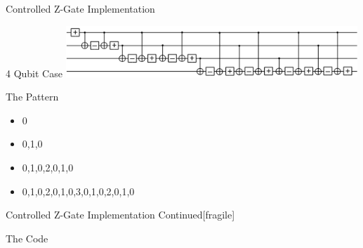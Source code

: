 \documentclass{beamer}
\begin{document}
\begin{frame}{Controlled Z-Gate Implementation}

\begin{block}{4 Qubit Case}
\includegraphics[width=11cm]{4qubitcontrolledzgate.jpg}
\end{block}

\begin{block}{The Pattern}
\begin{itemize}
  \item 0
  \item 0,1,0
  \item 0,1,0,2,0,1,0
  \item 0,1,0,2,0,1,0,3,0,1,0,2,0,1,0
\end{itemize}
\end{block}

\end{frame}


\begin{frame}{Controlled Z-Gate Implementation Continued}[fragile]
\begin{block}{The Code}
\end{block}
\end{frame}
\end{document}
